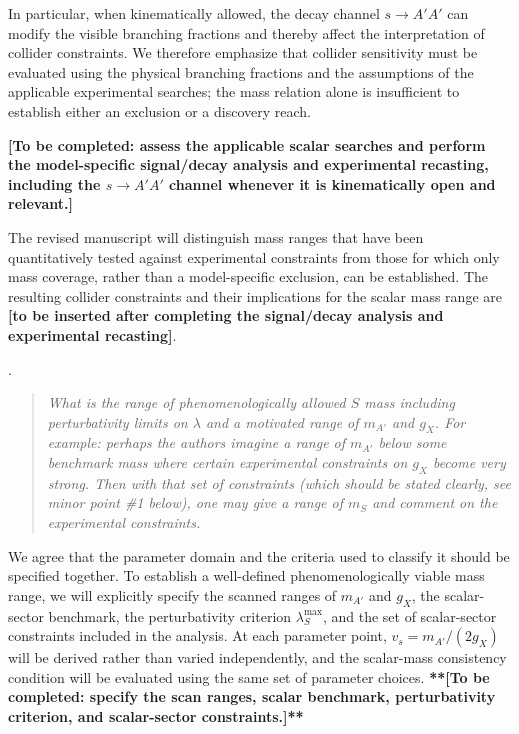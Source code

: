 \documentclass[12pt,a4paper]{article}
\begin{document}
In particular, when kinematically allowed, the decay channel \(s\to A'A'\) can modify the visible branching fractions and thereby affect the interpretation of collider constraints. We therefore emphasize that collider sensitivity must be evaluated using the physical branching fractions and the assumptions of the applicable experimental searches; the mass relation alone is insufficient to establish either an exclusion or a discovery reach.

\textbf{[To be completed: assess the applicable scalar searches and perform the model-specific signal/decay analysis and experimental recasting, including the \(s\to A'A'\) channel whenever it is kinematically open and relevant.]}

The revised manuscript will distinguish mass ranges that have been quantitatively tested against experimental constraints from those for which only mass coverage, rather than a model-specific exclusion, can be established. The resulting collider constraints and their implications for the scalar mass range are \textbf{[to be inserted after completing the signal/decay analysis and experimental recasting]}.

\medskip
{}. \begin{quote}\itshape
What is the range of phenomenologically allowed \(S\) mass including perturbativity limits on \(\lambda\) and a motivated range of \(m_{A'}\) and \(g_X\). For example: perhaps the authors imagine a range of \(m_{A'}\) below some benchmark mass where certain experimental constraints on \(g_X\) become very strong. Then with that set of constraints (which should be stated clearly, see minor point \#1 below), one may give a range of \(m_S\) and comment on the experimental constraints.\end{quote}

We agree that the parameter domain and the criteria used to classify it should be specified together. To establish a well-defined phenomenologically viable mass range, we will explicitly specify the scanned ranges of \(m_{A'}\) and \(g_X\), the scalar-sector benchmark, the perturbativity criterion \(\lambda_S^{\max}\), and the set of scalar-sector constraints included in the analysis. At each parameter point, \(v_s=m_{A'}/(2g_X)\) will be derived rather than varied independently, and the scalar-mass consistency condition will be evaluated using the same set of parameter choices. \textbf{**[To be completed: specify the scan ranges, scalar benchmark, perturbativity criterion, and scalar-sector constraints.]**}
\end{document}
